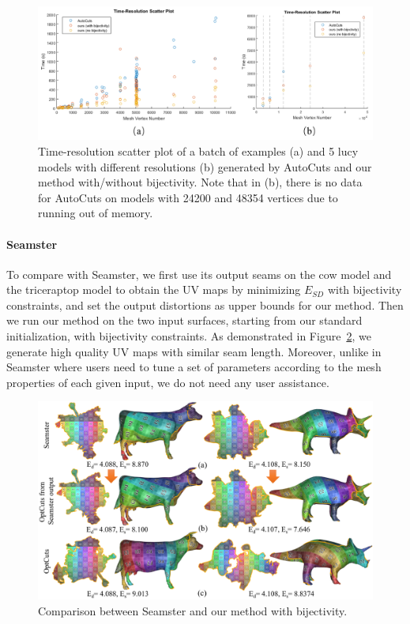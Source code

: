\begin{figure}[!h]
\centering
\includegraphics[width=\linewidth]{fig/time_res_compAutoCuts.png}
\caption{Time-resolution scatter plot of a batch of examples (a) and 5 lucy models with different resolutions (b) generated by AutoCuts and our method with/without bijectivity. Note that in (b), there is no data for AutoCuts on models with 24200 and 48354 vertices due to running out of memory.}
\label{fig:time_res_compAutoCuts}
\end{figure}

\paragraph{Seamster}
To compare with Seamster, we first use its output seams on the cow model and the triceraptop model to obtain the UV maps by minimizing $E_{SD}$ with bijectivity constraints, and set the output distortions as upper bounds for our method. Then we run our method on the two input surfaces, starting from our standard initialization, with bijectivity constraints. As demonstrated in Figure~\ref{fig:comp_Seamster}, we generate high quality UV maps with similar seam length. Moreover, unlike in Seamster where users need to tune a set of parameters according to the mesh properties of each given input, we do not need any user assistance.

\begin{figure}[!h]
\centering
\includegraphics[width=\linewidth]{fig/comp_Seamster.png}
\caption{Comparison between Seamster and our method with bijectivity.}
\label{fig:comp_Seamster}
\end{figure}

